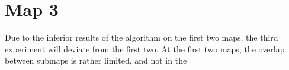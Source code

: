 \section{Map 3}
Due to the inferior results of the algorithm on the first two maps, the third experiment will deviate from the first two. At the first two maps, the overlap between submaps is rather limited, and not in the 




